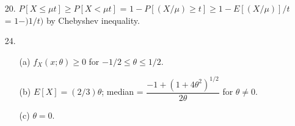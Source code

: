 \begin{enumerate}
	\item[20.] $P[X\le \mu t] \ge P[X < \mu t]$ = $1-P[(X/\mu) \ge t] \ge 1 - E[(X/\mu)]/t$ = $ 1- )1/t)$ by Chebyshev inequality. 
	
	\item[24.] \begin{enumerate}
		\item[(a)] $f_X(x;\theta) \ge 0$ for $-1/2 \le \theta \le 1/2$. 
		\item[(b)] $E[X] = (2/3)\theta$; median = $ \dfrac{-1+(1+4\theta^2)^{1/2}}{2\theta}$ for $\theta \ne 0$.
		\item[(c)] $\theta = 0$.
	\end{enumerate} 

\end{enumerate} 
